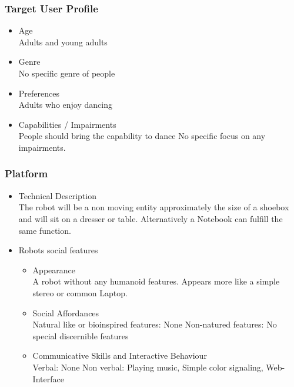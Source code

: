 \documentclass{article}
\begin{document}
\subsubsection{Target User Profile}
\begin{itemize}
\item Age\\
    Adults and young adults

\item Genre\\
    No specific genre of people

\item Preferences\\
    Adults who enjoy dancing

\item Capabilities / Impairments\\
    People should bring the capability to dance
    No specific focus on any impairments.
\end{itemize}

\subsubsection{Platform}
\begin{itemize}
\item Technical Description\\
    The robot will be a non moving entity approximately the size of a shoebox and will sit on a dresser or table. Alternatively a Notebook can fulfill the same function.

\item Robots social features
\begin{itemize}
    \item Appearance\\
        A robot without any humanoid features. Appears more like a simple stereo or common Laptop.
    
    \item Social Affordances\\
        Natural like or bioinspired features: None
        Non-natured features: No special discernible features

    \item Communicative Skills and Interactive Behaviour\\
        Verbal: None
        Non verbal: Playing music, Simple color signaling, Web-Interface
\end{itemize}
\end{itemize}
\end{document}
